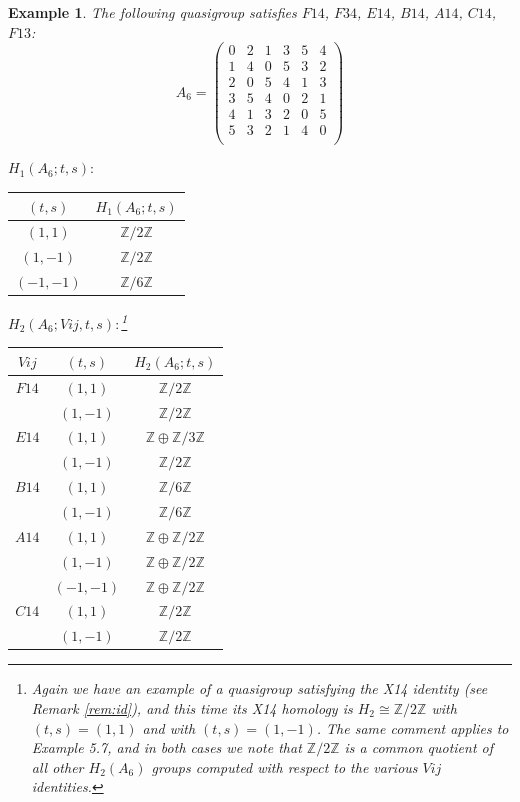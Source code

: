 \documentclass[11pt]{amsart}
\newtheorem{example}[theorem]{Example}
\theoremstyle{definition}
\newcommand{\Z}{\mathbb{Z}}
\begin{document}
\begin{example}
The following quasigroup satisfies 
$F14$, $F34$, $E14$, $B14$, $A14$, $C14$, $F13$:
   \[ A_6 = \left(
\begin{array}{cccccc}
 0 & 2 & 1 & 3 & 5 & 4 \\
 1 & 4 & 0 & 5 & 3 & 2 \\
 2 & 0 & 5 & 4 & 1 & 3 \\
 3 & 5 & 4 & 0 & 2 & 1 \\
 4 & 1 & 3 & 2 & 0 & 5 \\
 5 & 3 & 2 & 1 & 4 & 0 \\
\end{array}
\right) \]

\bigskip

$H_1(A_6;t,s):$

\begin{center}
    
\begin{tabular}{c|c}
    $(t,s)$ & $H_1(A_6;t,s)$  \\
    \hline
    $(1,1)$ & $\Z/2\Z$ \\
    $(1,-1)$ & $\Z/2\Z$ \\
    $(-1,-1)$ & $\Z/6\Z$ \\
\end{tabular}
\end{center}
\bigskip

$H_2(A_6;Vij,t,s):$\footnote{Again we have an example of a quasigroup satisfying the X14 identity (see Remark \ref{rem:id}), and this time its X14 homology is $H_2 \cong \Z/2\Z$ with $(t,s) = (1,1)$ and with $(t,s) = (1,-1)$. The same comment applies to Example 5.7, and in both cases we note that $\Z/2\Z$ is a common quotient of all other $H_2(A_6)$ groups computed with respect to the various $Vij$ identities.}

\begin{center}
    
\begin{tabular}{c|c|c}
    $Vij$ & $(t,s)$ & $H_2(A_6;t,s)$  \\
    \hline

    $F14$ & $(1,1)$ & $\Z/2\Z$ \\
        & $(1,-1)$ & $\Z/2\Z$ \\
    $E14$ & $(1,1)$ & $\Z \oplus \Z/3\Z$ \\
        & $(1,-1)$ & $\Z/2\Z$ \\
    $B14$ & $(1,1)$ & $\Z/6\Z$ \\
        & $(1,-1)$ & $\Z/6\Z$ \\
    $A14$ & $(1,1)$ & $\Z \oplus \Z/2\Z$ \\
        & $(1,-1)$ & $\Z \oplus \Z/2\Z$ \\
        & $(-1,-1)$ & $\Z \oplus \Z/2\Z$ \\
    $C14$ & $(1,1)$ & $\Z/2\Z$ \\
        & $(1,-1)$ & $\Z/2\Z$ \\

\end{tabular}

\end{center}

\end{example}
\end{document}
